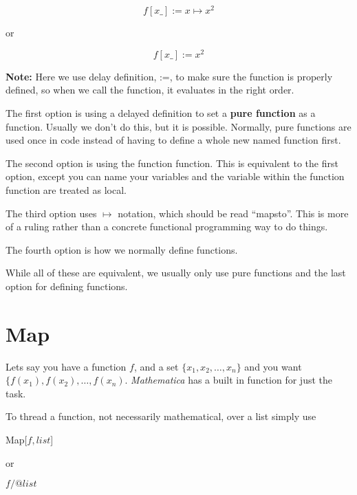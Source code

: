 \documentclass[11pt,letterpaper,twoside,titlepage]{book}
\newcommand{\Mathematica}{\textit{Mathematica} }
\begin{document}
				\[ f[x\_]:= x \mapsto x^2 \]
				
				or 
				
				\[ f[x\_]:= x^2 \]
				
				\textbf{Note:} Here we use delay definition, :=, to make sure the function is properly defined, so when we call the function, it evaluates in the right order.  
				
				The first option is using a delayed definition to set a \textbf{pure function} as a function.  Usually we don't do this, but it is possible.  Normally, pure functions are used once in code instead of having to define a whole new named function first.  
				
				The second option is using the function function.  This is equivalent to the first option, except you can name your variables and the variable within the function function are treated as local.  
				
				The third option uses $\mapsto$ notation, which should be read ``mapsto''.  This is more of a ruling rather than a concrete functional programming way to do things.  
				
				The fourth option is how we normally define functions.  
				
				While all of these are equivalent, we usually only use pure functions and the last option for defining functions.
				
			\section{Map}
			
				Lets say you have a function $f$, and a set $\{ x_1, x_2, \dots, x_n \}$ and you want $\{ f(x_1), f(x_2), \dots, f(x_n)$.  \Mathematica has a built in function for just the task.  
				
				To thread a function, not necessarily mathematical, over a list simply use 
				
				\begin{center}
				
					Map[$f,list$]
				
				\end{center}
				
				or 
				
				\begin{center}
				
					$f /@ list$
				
				\end{center}
				
\end{document}
